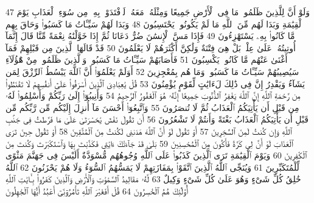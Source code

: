 {\tiny\colorbox{cl_aya}{47}} وَلَوْ أَنَّ لِلَّذِينَ ظَلَمُوا۟ مَا فِى ٱلْأَرْضِ جَمِيعًا وَمِثْلَهُۥ مَعَهُۥ لَٱفْتَدَوْا۟ بِهِۦ مِن سُوٓءِ ٱلْعَذَابِ يَوْمَ ٱلْقِيَٰمَةِ وَبَدَا لَهُم مِّنَ ٱللَّهِ مَا لَمْ يَكُونُوا۟ يَحْتَسِبُونَ
{\tiny\colorbox{cl_aya}{48}} وَبَدَا لَهُمْ سَيِّـَٔاتُ مَا كَسَبُوا۟ وَحَاقَ بِهِم مَّا كَانُوا۟ بِهِۦ يَسْتَهْزِءُونَ
{\tiny\colorbox{cl_aya}{49}} فَإِذَا مَسَّ ٱلْإِنسَٰنَ ضُرٌّ دَعَانَا ثُمَّ إِذَا خَوَّلْنَٰهُ نِعْمَةً مِّنَّا قَالَ إِنَّمَآ أُوتِيتُهُۥ عَلَىٰ عِلْمٍۭ بَلْ هِىَ فِتْنَةٌ وَلَٰكِنَّ أَكْثَرَهُمْ لَا يَعْلَمُونَ
{\tiny\colorbox{cl_aya}{50}} قَدْ قَالَهَا ٱلَّذِينَ مِن قَبْلِهِمْ فَمَآ أَغْنَىٰ عَنْهُم مَّا كَانُوا۟ يَكْسِبُونَ
{\tiny\colorbox{cl_aya}{51}} فَأَصَابَهُمْ سَيِّـَٔاتُ مَا كَسَبُوا۟ وَٱلَّذِينَ ظَلَمُوا۟ مِنْ هَٰٓؤُلَآءِ سَيُصِيبُهُمْ سَيِّـَٔاتُ مَا كَسَبُوا۟ وَمَا هُم بِمُعْجِزِينَ
{\tiny\colorbox{cl_aya}{52}} أَوَلَمْ يَعْلَمُوٓا۟ أَنَّ ٱللَّهَ يَبْسُطُ ٱلرِّزْقَ لِمَن يَشَآءُ وَيَقْدِرُ إِنَّ فِى ذَٰلِكَ لَءَايَٰتٍ لِّقَوْمٍ يُؤْمِنُونَ
{\tiny\colorbox{cl_aya}{53}} قُلْ يَٰعِبَادِىَ ٱلَّذِينَ أَسْرَفُوا۟ عَلَىٰٓ أَنفُسِهِمْ لَا تَقْنَطُوا۟ مِن رَّحْمَةِ ٱللَّهِ إِنَّ ٱللَّهَ يَغْفِرُ ٱلذُّنُوبَ جَمِيعًا إِنَّهُۥ هُوَ ٱلْغَفُورُ ٱلرَّحِيمُ
{\tiny\colorbox{cl_aya}{54}} وَأَنِيبُوٓا۟ إِلَىٰ رَبِّكُمْ وَأَسْلِمُوا۟ لَهُۥ مِن قَبْلِ أَن يَأْتِيَكُمُ ٱلْعَذَابُ ثُمَّ لَا تُنصَرُونَ
{\tiny\colorbox{cl_aya}{55}} وَٱتَّبِعُوٓا۟ أَحْسَنَ مَآ أُنزِلَ إِلَيْكُم مِّن رَّبِّكُم مِّن قَبْلِ أَن يَأْتِيَكُمُ ٱلْعَذَابُ بَغْتَةً وَأَنتُمْ لَا تَشْعُرُونَ
{\tiny\colorbox{cl_aya}{56}} أَن تَقُولَ نَفْسٌ يَٰحَسْرَتَىٰ عَلَىٰ مَا فَرَّطتُ فِى جَنۢبِ ٱللَّهِ وَإِن كُنتُ لَمِنَ ٱلسَّٰخِرِينَ
{\tiny\colorbox{cl_aya}{57}} أَوْ تَقُولَ لَوْ أَنَّ ٱللَّهَ هَدَىٰنِى لَكُنتُ مِنَ ٱلْمُتَّقِينَ
{\tiny\colorbox{cl_aya}{58}} أَوْ تَقُولَ حِينَ تَرَى ٱلْعَذَابَ لَوْ أَنَّ لِى كَرَّةً فَأَكُونَ مِنَ ٱلْمُحْسِنِينَ
{\tiny\colorbox{cl_aya}{59}} بَلَىٰ قَدْ جَآءَتْكَ ءَايَٰتِى فَكَذَّبْتَ بِهَا وَٱسْتَكْبَرْتَ وَكُنتَ مِنَ ٱلْكَٰفِرِينَ
{\tiny\colorbox{cl_aya}{60}} وَيَوْمَ ٱلْقِيَٰمَةِ تَرَى ٱلَّذِينَ كَذَبُوا۟ عَلَى ٱللَّهِ وُجُوهُهُم مُّسْوَدَّةٌ أَلَيْسَ فِى جَهَنَّمَ مَثْوًى لِّلْمُتَكَبِّرِينَ
{\tiny\colorbox{cl_aya}{61}} وَيُنَجِّى ٱللَّهُ ٱلَّذِينَ ٱتَّقَوْا۟ بِمَفَازَتِهِمْ لَا يَمَسُّهُمُ ٱلسُّوٓءُ وَلَا هُمْ يَحْزَنُونَ
{\tiny\colorbox{cl_aya}{62}} ٱللَّهُ خَٰلِقُ كُلِّ شَىْءٍ وَهُوَ عَلَىٰ كُلِّ شَىْءٍ وَكِيلٌ
{\tiny\colorbox{cl_aya}{63}} لَّهُۥ مَقَالِيدُ ٱلسَّمَٰوَٰتِ وَٱلْأَرْضِ وَٱلَّذِينَ كَفَرُوا۟ بِـَٔايَٰتِ ٱللَّهِ أُو۟لَٰٓئِكَ هُمُ ٱلْخَٰسِرُونَ
{\tiny\colorbox{cl_aya}{64}} قُلْ أَفَغَيْرَ ٱللَّهِ تَأْمُرُوٓنِّىٓ أَعْبُدُ أَيُّهَا ٱلْجَٰهِلُونَ
